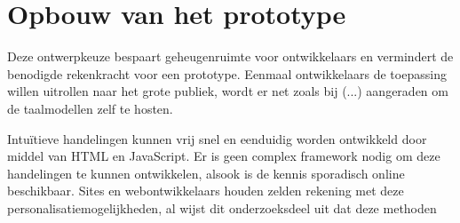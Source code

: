 \section{Opbouw van het prototype}

Deze ontwerpkeuze bespaart geheugenruimte voor ontwikkelaars en vermindert de benodigde rekenkracht voor een prototype. Eenmaal ontwikkelaars de toepassing willen uitrollen naar het grote publiek, wordt er net zoals bij (...) aangeraden om de taalmodellen zelf te hosten.

Intuïtieve handelingen kunnen vrij snel en eenduidig worden ontwikkeld door middel van HTML en JavaScript. Er is geen complex framework nodig om deze handelingen te kunnen ontwikkelen, alsook is de kennis sporadisch online beschikbaar. Sites en webontwikkelaars houden zelden rekening met deze personalisatiemogelijkheden, al wijst dit onderzoeksdeel uit dat deze methoden

